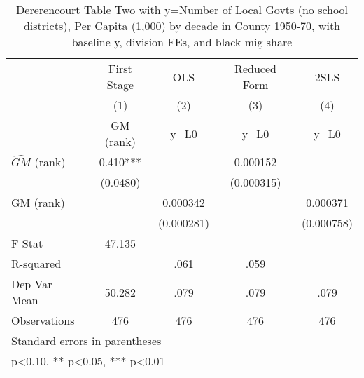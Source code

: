 \begin{table}[htbp]\centering
\def\sym#1{\ifmmode^{#1}\else\(^{#1}\)\fi}
\caption{Dererencourt Table Two with y=Number of Local Govts (no school districts), Per Capita (1,000) by decade in County 1950-70, with baseline y, division FEs, and black mig share}
\begin{tabular}{l*{4}{c}}
\toprule
                    & First Stage   &         OLS   &Reduced Form   &        2SLS   \\
                    &\multicolumn{1}{c}{(1)}&\multicolumn{1}{c}{(2)}&\multicolumn{1}{c}{(3)}&\multicolumn{1}{c}{(4)}\\
                    &\multicolumn{1}{c}{GM  (rank)}&\multicolumn{1}{c}{y\_L0}&\multicolumn{1}{c}{y\_L0}&\multicolumn{1}{c}{y\_L0}\\
\midrule
$\hat{GM}$ (rank)   &       0.410***&               &    0.000152   &               \\
                    &    (0.0480)   &               &  (0.000315)   &               \\
\addlinespace
GM  (rank)          &               &    0.000342   &               &    0.000371   \\
                    &               &  (0.000281)   &               &  (0.000758)   \\
\midrule
F-Stat              &      47.135   &               &               &               \\
R-squared           &               &        .061   &        .059   &               \\
Dep Var Mean        &      50.282   &        .079   &        .079   &        .079   \\
Observations        &         476   &         476   &         476   &         476   \\
\bottomrule
\multicolumn{5}{l}{\footnotesize Standard errors in parentheses}\\
\multicolumn{5}{l}{\footnotesize * p<0.10, ** p<0.05, *** p<0.01}\\
\end{tabular}
\end{table}
